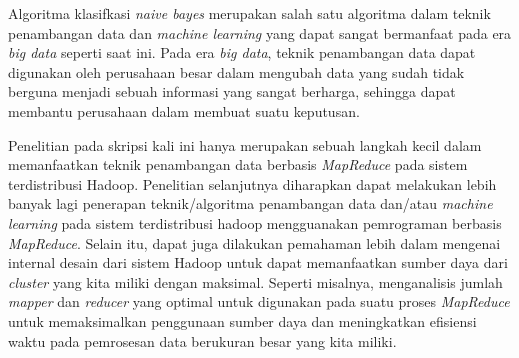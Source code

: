 Algoritma klasifkasi \textit{naive bayes} merupakan salah satu algoritma dalam teknik penambangan data dan \textit{machine learning} yang dapat sangat bermanfaat pada era \textit{big data} seperti saat ini. Pada era \textit{big data}, teknik penambangan data dapat digunakan oleh perusahaan besar dalam mengubah data yang sudah tidak berguna menjadi sebuah informasi yang sangat berharga, sehingga dapat membantu perusahaan dalam membuat suatu keputusan.

Penelitian pada skripsi kali ini hanya merupakan sebuah langkah kecil dalam memanfaatkan teknik penambangan data berbasis \textit{MapReduce} pada sistem terdistribusi Hadoop. Penelitian selanjutnya diharapkan dapat melakukan lebih banyak lagi penerapan teknik/algoritma penambangan data dan/atau \textit{machine learning} pada sistem terdistribusi hadoop mengguanakan pemrograman berbasis \textit{MapReduce}. Selain itu, dapat juga dilakukan pemahaman lebih dalam mengenai internal desain dari sistem Hadoop untuk dapat memanfaatkan sumber daya dari \textit{cluster} yang kita miliki dengan maksimal. Seperti misalnya, menganalisis jumlah \textit{mapper} dan \textit{reducer} yang optimal untuk digunakan pada suatu proses \textit{MapReduce} untuk memaksimalkan penggunaan sumber daya dan meningkatkan efisiensi waktu pada pemrosesan data berukuran besar yang kita miliki.


